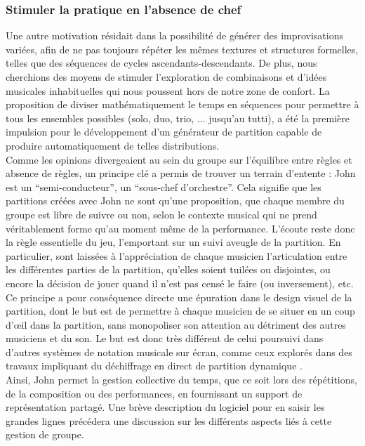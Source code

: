 \subsubsection{Stimuler la pratique en l'absence de chef}
%
\noindent Une autre motivation résidait dans la possibilité de générer des improvisations variées, afin de ne pas toujours répéter les mêmes textures et structures formelles, telles que des séquences de cycles ascendants-descendants. De plus, nous cherchions des moyens de stimuler l'exploration de combinaisons et d'idées musicales inhabituelles qui nous poussent hors de notre zone de confort. La proposition de diviser mathématiquement le temps en séquences pour permettre à tous les ensembles possibles (solo, duo, trio, ... jusqu'au tutti), a été la première impulsion pour le développement d'un générateur de partition capable de produire automatiquement de telles distributions.\\
\indent Comme les opinions divergeaient au sein du groupe sur l'équilibre entre règles et absence de règles, un principe clé a permis de trouver un terrain d'entente : John est un ``semi-conducteur'', un ``sous-chef d'orchestre''. Cela signifie que les partitions créées avec John ne sont qu'une proposition, que chaque membre du groupe est libre de suivre ou non, selon le contexte musical qui ne prend véritablement forme qu'au moment même de la performance. L'écoute reste donc la règle essentielle du jeu, l'emportant sur un suivi aveugle de la partition. En particulier, sont laissées à l'appréciation de chaque musicien l'articulation entre les différentes parties de la partition, qu'elles soient tuilées ou disjointes, ou encore la décision de jouer quand il n'est pas censé le faire (ou inversement), etc.\\
\indent Ce principe a pour conséquence directe une épuration dans le design visuel de la partition, dont le but est de permettre à chaque musicien de se situer en un coup d'œil dans la partition, sans monopoliser son attention au détriment des autres musiciens et du son. Le but est donc très différent de celui poursuivi dans d'autres systèmes de notation musicale sur écran, comme ceux explorés dans des travaux impliquant du déchiffrage en direct de partition dynamique \cite{freeman_extreme_2008}.\\
\indent Ainsi, John permet la gestion collective du temps, que ce soit lors des répétitions, de la composition ou des performances, en fournissant un support de représentation partagé. Une brève description du logiciel pour en saisir les grandes lignes précédera une discussion sur les différents aspects liés à cette gestion de groupe.

